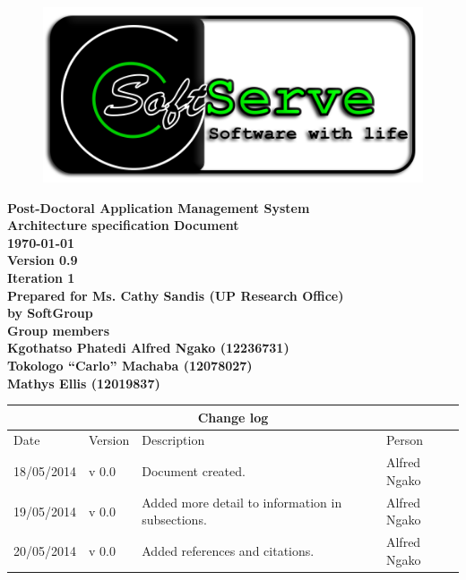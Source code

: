 \documentclass[12pt]{article}
\newcommand{\Title}{Architecture specification Document} %
\newcommand{\ssr}{Soft\color{green}{Serve }\color{black}}
\newcommand{\version}{0.9}
\newcommand{\iteration}{1}
\newcommand{\client}{Ms. Cathy Sandis (UP Research Office)}
\newcommand{\project}{Post-Doctoral Application Management System}
\begin{document}
\vspace{4em}

\begin{center}%

\begin{figure}[ht!]
\centering
\includegraphics{../Images_Docs/logo.png}
\end{figure}
\LARGE \bf \project \\[1em]
\LARGE \bf \Title \\[0.25em]
\large \bf \today\\
\bf Version \version\\
\bf Iteration \iteration\\[0.5em]
\Large \bf Prepared for \client\\
\Large \bf by
\Large {\bf \ssr Group }\\[0.5em]
\LARGE {\bf Group members}\\[0.25em]
\large
Kgothatso Phatedi Alfred Ngako (12236731) \\[0.5em]
Tokologo “Carlo” Machaba (12078027) \\[0.5em]
Mathys Ellis (12019837) \\[8em]

\end{center}%


\begin{center}
\begin{tabular}{|l|p{1.4cm}|p{8cm}|p{2.8cm}|}
\hline
\multicolumn{4}{|c|}{\bf Change log} \\
\hline
 Date & Version & Description &  Person \\
\hline
18/05/2014 & v 0.0 & Document created. & Alfred Ngako \\
\hline
19/05/2014 & v 0.0 & Added more detail to information in subsections. & Alfred Ngako \\
\hline
20/05/2014 & v 0.0 & Added references and citations. & Alfred Ngako \\
\hline
\end{tabular}
\end{center}
\newpage
\tableofcontents
\end{document}
